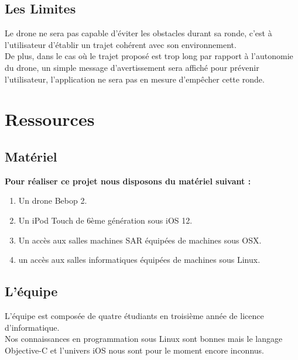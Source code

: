 \documentclass{article}
\begin{document}
	\subsection{Les Limites}
		Le drone ne sera pas capable d'éviter les obstacles durant sa ronde, c'est à l'utilisateur d'établir un trajet cohérent avec son environnement.\\
		De plus, dans le cas où le trajet proposé est trop long par rapport à l'autonomie du drone, un simple message d'avertissement sera affiché pour prévenir l'utilisateur, l'application ne sera pas en mesure d'empêcher cette ronde.
	
	

	
\section{Ressources}
	\subsection{Matériel}
		\begin{flushleft}
	    \textbf{Pour réaliser ce projet nous disposons du matériel suivant :}
	    \end{flushleft}
		\begin{enumerate}
        \item Un drone Bebop 2.
        \item Un iPod Touch de 6ème génération sous iOS 12.
        \item Un accès aux salles machines SAR équipées de machines sous OSX.
        \item un accès aux salles informatiques équipées de machines sous Linux.
        \end{enumerate}
        
	\subsection{L'équipe}

	L'équipe est composée de quatre étudiants en troisième année de licence d'informatique.\\
        Nos connaissances en programmation sous Linux sont bonnes mais le langage Objective-C et l'univers iOS nous sont pour le moment encore inconnus.
\end{document}
